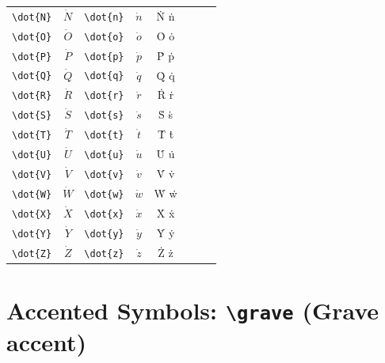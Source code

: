 \documentclass[12pt,a4paper]{article}
\begin{document}
\begin{longtable}{|l|c|l|c|c|l|c|c|}
\verb|\dot{N}| & $\dot{N}$       & \verb|\dot{n}| & $\dot{n}$       & Ṅ ṅ            &                 &                 & \\
\verb|\dot{O}| & $\dot{O}$       & \verb|\dot{o}| & $\dot{o}$       & Ȯ ȯ            &                 &                 & \\
\verb|\dot{P}| & $\dot{P}$       & \verb|\dot{p}| & $\dot{p}$       & Ṗ ṗ            &                 &                 & \\
\verb|\dot{Q}| & $\dot{Q}$       & \verb|\dot{q}| & $\dot{q}$       & Q̇ q̇            &                 &                 & \\
\verb|\dot{R}| & $\dot{R}$       & \verb|\dot{r}| & $\dot{r}$       & Ṙ ṙ            &                 &                 & \\
\verb|\dot{S}| & $\dot{S}$       & \verb|\dot{s}| & $\dot{s}$       & Ṡ ṡ            &                 &                 & \\
\verb|\dot{T}| & $\dot{T}$       & \verb|\dot{t}| & $\dot{t}$       & Ṫ ṫ            &                 &                 & \\
\verb|\dot{U}| & $\dot{U}$       & \verb|\dot{u}| & $\dot{u}$       & U̇ u̇            &                 &                 & \\
\verb|\dot{V}| & $\dot{V}$       & \verb|\dot{v}| & $\dot{v}$       & V̇ v̇            &                 &                 & \\
\verb|\dot{W}| & $\dot{W}$       & \verb|\dot{w}| & $\dot{w}$       & Ẇ ẇ            &                 &                 & \\
\verb|\dot{X}| & $\dot{X}$       & \verb|\dot{x}| & $\dot{x}$       & Ẋ ẋ            &                 &                 & \\
\verb|\dot{Y}| & $\dot{Y}$       & \verb|\dot{y}| & $\dot{y}$       & Ẏ ẏ            &                 &                 & \\
\verb|\dot{Z}| & $\dot{Z}$       & \verb|\dot{z}| & $\dot{z}$       & Ż ż            &                 &                 & \\
\hline
\end{longtable}

\newpage

\section*{Accented Symbols: \texttt{\textbackslash grave} (Grave accent)}
\end{document}
